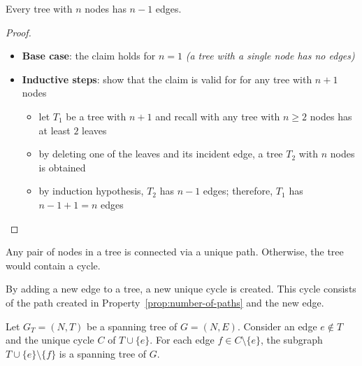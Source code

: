 \documentclass[english]{article}
\begin{document}
\begin{property}
  Every tree with \(n\) nodes has \(n-1\) edges.
\end{property}

\begin{proof}
  \hfill
  \begin{itemize}
    \item \textbf{Base case}: the claim holds for \(n=1\) \textit{(a tree with a single node has no edges)}
    \item \textbf{Inductive steps}: show that the claim is valid for for any tree with \(n + 1\) nodes
          \begin{itemize}
            \item let \(T_1\) be a tree with \(n+1\) and recall with any tree with \(n \geq 2\) nodes has at least \(2\) leaves
            \item by deleting one of the leaves and its incident edge, a tree \(T_2\) with \(n\) nodes is obtained
            \item by induction hypothesis, \(T_2\) has \(n-1\) edges; therefore, \(T_1\) has \(n-1+1=n\) edges
          \end{itemize}
  \end{itemize}
\end{proof}

\begin{property}
  Any pair of nodes in a tree is connected via a unique path.
  Otherwise, the tree would contain a cycle.
  \label{prop:number-of-paths}
\end{property}

\begin{property}
  By adding a new edge to a tree, a new unique cycle is created.
  This cycle consists of the path created in Property~\ref{prop:number-of-paths} and the new edge.
\end{property}

\begin{property}
  Let \(G_T = (N, T)\) be a spanning tree of \(G = (N, E)\).
  Consider an edge \(e \notin T\) and the unique cycle \(C\) of \(T \cup \{e\}\).
  For each edge \(f \in C \setminus \{e\}\), the subgraph \(T \cup \{e\} \setminus \{f\}\) is a spanning tree of \(G\).
\end{property}
\end{document}
